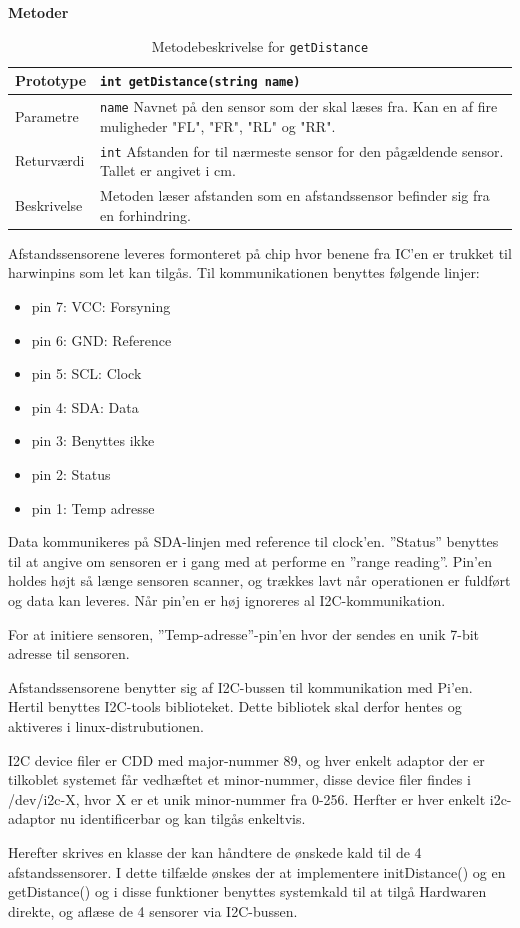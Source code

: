 \textbf{Metoder}

\begin{table}[h]
\begin{tabularx}{\textwidth}{| L{2.5 cm} | Z |} \hline
Prototype & \texttt{int getDistance(string name)} \\\hline
Parametre & \texttt{name} \newline Navnet på den sensor som der skal læses fra. Kan en af fire muligheder "FL", "FR", "RL" og "RR". \\\hline
Returværdi &  \texttt{int} \newline Afstanden for til nærmeste sensor for den pågældende sensor. Tallet er angivet i cm. \\\hline
Beskrivelse & Metoden læser afstanden som en afstandssensor befinder sig fra en forhindring. \\\hline
\end{tabularx}
\caption{Metodebeskrivelse for \texttt{getDistance}}
\label{table:met_getdistance}
\end{table}
\clearpage


Afstandssensorene leveres formonteret på chip hvor benene fra IC'en er trukket til harwinpins som let kan tilgås. Til kommunikationen benyttes følgende linjer: 

\begin{itemize}
	\item pin 7: VCC: Forsyning
	\item pin 6: GND: Reference
	\item pin 5: SCL: Clock
	\item pin 4: SDA: Data
	\item pin 3: Benyttes ikke
	\item pin 2: Status
	\item pin 1: Temp adresse 
\end{itemize}

Data kommunikeres på SDA-linjen med reference til clock'en. ''Status'' benyttes til at angive om sensoren er i gang med at performe en ''range reading''. 
Pin'en holdes højt så længe sensoren scanner, og trækkes lavt når operationen er fuldført og data kan leveres. Når pin'en er høj ignoreres al I2C-kommunikation.

For at initiere sensoren, ''Temp-adresse''-pin'en hvor der sendes en unik 7-bit adresse til sensoren.
   
Afstandssensorene benytter sig af I2C-bussen til kommunikation med Pi'en. Hertil benyttes I2C-tools biblioteket.
Dette bibliotek skal derfor hentes og aktiveres i linux-distrubutionen.

I2C device filer er CDD med major-nummer 89, og hver enkelt adaptor der er tilkoblet systemet får vedhæftet et minor-nummer, 
disse device filer findes i /dev/i2c-X, hvor X er et unik minor-nummer fra 0-256. Herfter er hver enkelt i2c-adaptor nu identificerbar og kan tilgås enkeltvis. 

Herefter skrives en klasse der kan håndtere de ønskede kald til de 4 afstandssensorer. 
I dette tilfælde ønskes der at implementere initDistance() og en getDistance() og i disse funktioner benyttes systemkald til at tilgå Hardwaren direkte, og aflæse de 4 sensorer via I2C-bussen.